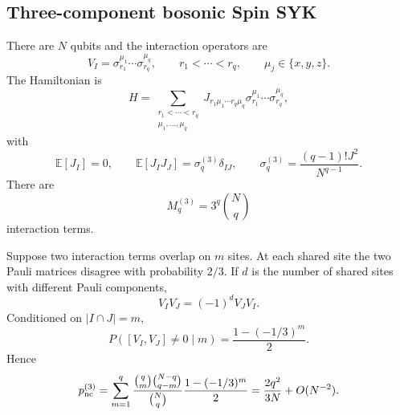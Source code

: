 \documentclass{article}
\theoremstyle{definition}
\begin{document}
\subsection{Three-component bosonic Spin SYK}

There are $N$ qubits and the interaction operators are
\begin{equation}
    V_I
    =\sigma_{r_1}^{\mu_1}\cdots\sigma_{r_q}^{\mu_q},
    \qquad
    r_1<\cdots<r_q,
    \qquad
    \mu_j\in\{x,y,z\}.
\end{equation}
The Hamiltonian is
\begin{equation}
    H
    =\sum_{\substack{r_1<\cdots<r_q\\
                      \mu_1,\ldots,\mu_q}}
    J_{r_1\mu_1\cdots r_q\mu_q}
    \sigma_{r_1}^{\mu_1}\cdots\sigma_{r_q}^{\mu_q},
\end{equation}
with
\begin{equation}
    \mathbb E[J_I]=0,
    \qquad
    \mathbb E[J_IJ_J]=\sigma_q^{(3)}\delta_{IJ},
    \qquad
    \sigma_q^{(3)}=\frac{(q-1)!J^2}{N^{q-1}}.
\end{equation}
There are
\begin{equation}
    M_q^{(3)}=3^q\binom Nq
\end{equation}
interaction terms.

Suppose two interaction terms overlap on $m$ sites.  At each shared site
the two Pauli matrices disagree with probability $2/3$.  If $d$ is the
number of shared sites with different Pauli components,
\begin{equation}
    V_IV_J=(-1)^dV_JV_I.
\end{equation}
Conditioned on $|I\cap J|=m$,
\begin{equation}
    P([V_I,V_J]\neq0\mid m)
    =\frac{1-(-1/3)^m}{2}.
\end{equation}
Hence
\begin{equation}
    p_{\rm nc}^{(3)}
    =\sum_{m=1}^q
    \frac{\binom qm\binom{N-q}{q-m}}{\binom Nq}
    \frac{1-(-1/3)^m}{2}
    =\frac{2q^2}{3N}+O(N^{-2}).
\end{equation}
\end{document}
